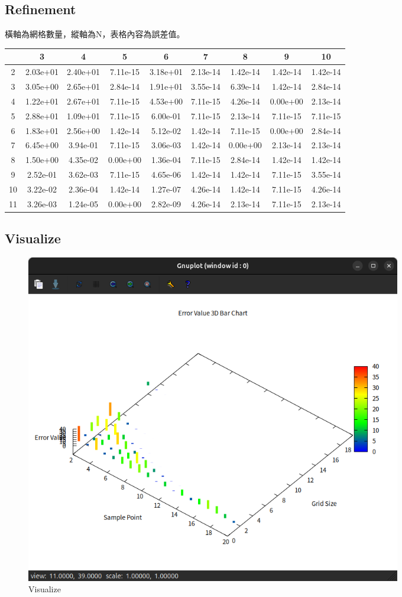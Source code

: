 \documentclass[a4paper,12pt]{article}
\begin{document}
\subsection{Refinement}
橫軸為網格數量，縱軸為N，表格內容為誤差值。
\begin{longtable}{|c|c|c|c|c|c|c|c|c|}
    \hline
    & 3 & 4 & 5 & 6 & 7 & 8 & 9 & 10\\
    \hline
    2 & 2.03e+01 & 2.40e+01 & 7.11e-15 & 3.18e+01 & 2.13e-14 & 1.42e-14 & 1.42e-14 & 1.42e-14 \\
    \hline
    3 & 3.05e+00 & 2.65e+01 & 2.84e-14 & 1.91e+01 & 3.55e-14 & 6.39e-14 & 1.42e-14 & 2.84e-14 \\
    \hline
    4 & 1.22e+01 & 2.67e+01 & 7.11e-15 & 4.53e+00 & 7.11e-15 & 4.26e-14 & 0.00e+00 & 2.13e-14 \\
    \hline
    5 & 2.88e+01 & 1.09e+01 & 7.11e-15 & 6.00e-01 & 7.11e-15 & 2.13e-14 & 7.11e-15 & 7.11e-15 \\
    \hline
    6 & 1.83e+01 & 2.56e+00 & 1.42e-14 & 5.12e-02 & 1.42e-14 & 7.11e-15 & 0.00e+00 & 2.84e-14 \\
    \hline
    7 & 6.45e+00 & 3.94e-01 & 7.11e-15 & 3.06e-03 & 1.42e-14 & 0.00e+00 & 2.13e-14 & 2.13e-14 \\
    \hline
    8 & 1.50e+00 & 4.35e-02 & 0.00e+00 & 1.36e-04 & 7.11e-15 & 2.84e-14 & 1.42e-14 & 1.42e-14 \\
    \hline
    9 & 2.52e-01 & 3.62e-03 & 7.11e-15 & 4.65e-06 & 1.42e-14 & 1.42e-14 & 7.11e-15 & 3.55e-14 \\
    \hline
    10 & 3.22e-02 & 2.36e-04 & 1.42e-14 & 1.27e-07 & 4.26e-14 & 1.42e-14 & 7.11e-15 & 4.26e-14 \\
    \hline
    11 & 3.26e-03 & 1.24e-05 & 0.00e+00 & 2.82e-09 & 4.26e-14 & 2.13e-14 & 7.11e-15 & 2.13e-14 \\
    \hline
    
\end{longtable}
\subsection{Visualize}
\begin{figure}[H]
    \centering
    \includegraphics[width=0.8\textwidth]{./img/plot.png}
    \caption{Visualize}
\end{figure}
\end{document}
